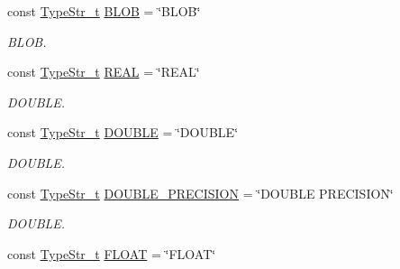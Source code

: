 \begin{DoxyCompactItemize}
const \hyperlink{namespacesf_1_1sql__types_a1a4f114cdf79706d2298e3454006e65b}{Type\+Str\+\_\+t} \hyperlink{namespacesf_1_1sql__types_a27db7db3803af68b095e51d281ba0abc}{B\+L\+OB} = \char`\"{}B\+L\+OB\char`\"{}
\begin{DoxyCompactList}\small\item\em B\+L\+OB. \end{DoxyCompactList}\item 
\mbox{\label{namespacesf_1_1sql__types_ae5d088aa8bbf46d520a19dc70418aaae}} 
const \hyperlink{namespacesf_1_1sql__types_a1a4f114cdf79706d2298e3454006e65b}{Type\+Str\+\_\+t} \hyperlink{namespacesf_1_1sql__types_ae5d088aa8bbf46d520a19dc70418aaae}{R\+E\+AL} = \char`\"{}R\+E\+AL\char`\"{}
\begin{DoxyCompactList}\small\item\em D\+O\+U\+B\+LE. \end{DoxyCompactList}\item 
\mbox{\label{namespacesf_1_1sql__types_af88812f4a2ee462fa1b6b1251a42d9f0}} 
const \hyperlink{namespacesf_1_1sql__types_a1a4f114cdf79706d2298e3454006e65b}{Type\+Str\+\_\+t} \hyperlink{namespacesf_1_1sql__types_af88812f4a2ee462fa1b6b1251a42d9f0}{D\+O\+U\+B\+LE} = \char`\"{}D\+O\+U\+B\+LE\char`\"{}
\begin{DoxyCompactList}\small\item\em D\+O\+U\+B\+LE. \end{DoxyCompactList}\item 
\mbox{\label{namespacesf_1_1sql__types_a098ce51a2f1e38bc7bba10341e4e2eb4}} 
const \hyperlink{namespacesf_1_1sql__types_a1a4f114cdf79706d2298e3454006e65b}{Type\+Str\+\_\+t} \hyperlink{namespacesf_1_1sql__types_a098ce51a2f1e38bc7bba10341e4e2eb4}{D\+O\+U\+B\+L\+E\+\_\+\+P\+R\+E\+C\+I\+S\+I\+ON} = \char`\"{}D\+O\+U\+B\+LE P\+R\+E\+C\+I\+S\+I\+ON\char`\"{}
\begin{DoxyCompactList}\small\item\em D\+O\+U\+B\+LE. \end{DoxyCompactList}\item 
\mbox{\label{namespacesf_1_1sql__types_ad723fc92e8ceaf7a83acfa6c730edb6c}} 
const \hyperlink{namespacesf_1_1sql__types_a1a4f114cdf79706d2298e3454006e65b}{Type\+Str\+\_\+t} \hyperlink{namespacesf_1_1sql__types_ad723fc92e8ceaf7a83acfa6c730edb6c}{F\+L\+O\+AT} = \char`\"{}F\+L\+O\+AT\char`\"{}

\end{DoxyCompactItemize}
